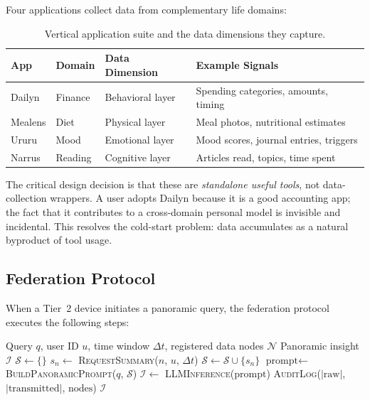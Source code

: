 \documentclass[11pt,a4paper]{article}
\newcommand{\appname}[1]{\textsf{#1}}
\begin{document}
Four applications collect data from complementary life domains:

\begin{table}[H]
\centering
\caption{Vertical application suite and the data dimensions they capture.}
\label{tab:apps}
\begin{tabular}{@{}llll@{}}
\toprule
\textbf{App} & \textbf{Domain} & \textbf{Data Dimension} & \textbf{Example Signals} \\
\midrule
\appname{Dailyn}  & Finance    & Behavioral layer & Spending categories, amounts, timing \\
\appname{Mealens} & Diet       & Physical layer   & Meal photos, nutritional estimates \\
\appname{Ururu}   & Mood       & Emotional layer  & Mood scores, journal entries, triggers \\
\appname{Narrus}  & Reading    & Cognitive layer  & Articles read, topics, time spent \\
\bottomrule
\end{tabular}
\end{table}

The critical design decision is that these are \emph{standalone useful tools},
not data-collection wrappers. A user adopts \appname{Dailyn} because it is a
good accounting app; the fact that it contributes to a cross-domain personal
model is invisible and incidental. This resolves the cold-start problem: data
accumulates as a natural byproduct of tool usage.

\subsection{Federation Protocol}
\label{sec:system:federation}

When a Tier~2 device initiates a panoramic query, the federation protocol
executes the following steps:

\begin{algorithm}[H]
\caption{LAN Federation Protocol for Panoramic Query}
\label{alg:federation}
\begin{algorithmic}[1]
\REQUIRE Query $q$, user ID $u$, time window $\Delta t$, registered data nodes $\mathcal{N}$
\ENSURE Panoramic insight $\mathcal{I}$
\STATE $\mathcal{S} \leftarrow \{\}$ 
  \STATE $s_n \leftarrow$ \textsc{RequestSummary}($n$, $u$, $\Delta t$) 
  \STATE $\mathcal{S} \leftarrow \mathcal{S} \cup \{s_n\}$
\ENDFOR
\STATE $\text{prompt} \leftarrow$ \textsc{BuildPanoramicPrompt}($q$, $\mathcal{S}$)
\STATE $\mathcal{I} \leftarrow$ \textsc{LLMInference}($\text{prompt}$) 
\STATE \textsc{AuditLog}($|\text{raw}|$, $|\text{transmitted}|$, $\text{nodes}$) 
\RETURN $\mathcal{I}$
\end{algorithmic}
\end{algorithm}
\end{document}
